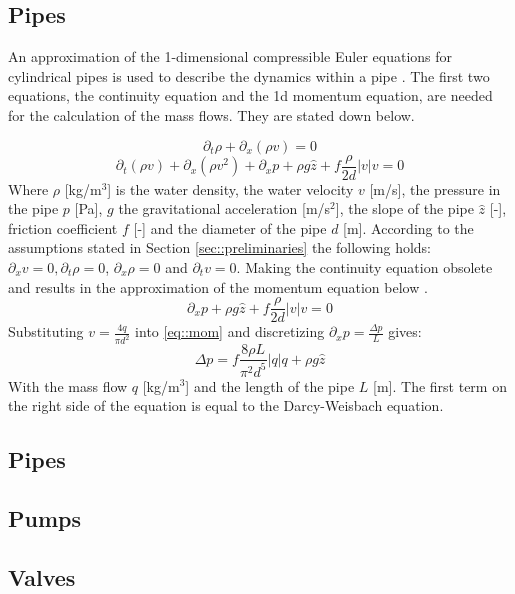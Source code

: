 \subsection{Pipes}
An approximation of the 1-dimensional compressible Euler equations for cylindrical pipes is used to describe the dynamics within a pipe \cite{Krug2020}. The first two equations, the continuity equation and the 1d momentum equation, are needed for the calculation of the mass flows. They are stated down below.

\begin{equation}
\partial_t \rho+\partial_x\left(\rho v\right)=0
\end{equation}
\begin{equation}
\partial_t (\rho v)+\partial_x(\rho v^2)+ \partial_x p+\rho g \hat{z}  +f \frac{\rho}{2 d}|v| v=0
\end{equation}
Where $\rho$ [kg/m$^3$] is the water density, the water velocity $v$ [m/s], the pressure in the pipe $p$ [Pa], $g$ the gravitational acceleration [m/s$^2$], the slope of the pipe $\hat{z}$ [-], friction coefficient $f$ [-] and the diameter of the pipe $d$ [m]. According to the assumptions stated in Section \ref{sec::preliminaries} the following holds: $\partial_x v = 0, \partial_t \rho = 0$, $\partial_x \rho = 0$ and $\partial_t v = 0$. Making the continuity equation obsolete and results in the approximation of the momentum equation below \cite{sibeijn2025economic}. 
\begin{equation}\label{eq::mom}
\partial_x p + \rho g \hat{z} +f \frac{\rho}{2 d}\left|v\right| v=0
\end{equation}
Substituting $v = \frac{4 q}{\pi d^2}$ into \eqref{eq::mom} and discretizing $\partial_x p = \frac{\Delta p}{L}$ gives:
\begin{equation}
    \Delta p = f \frac{8\rho L}{\pi^2 d^5}\left|q\right| q + \rho g \hat{z}
\end{equation}
With the mass flow $q$ [kg/m$^3$] and the length of the pipe $L$ [m]. The first term on the right side of the equation is equal to the Darcy-Weisbach equation. 
\subsection{Pipes}
\subsection{Pumps}
\subsection{Valves}
